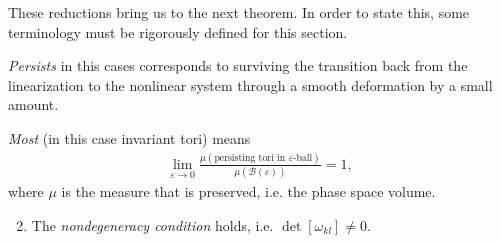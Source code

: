 These reductions bring us to the next theorem. In order to state this, some terminology must be rigorously defined for this section.
\begin{definition}
	\emph{Persists} in this cases corresponds to surviving the transition back from the linearization to the nonlinear system through a smooth deformation by a small amount.
\end{definition}
\begin{definition}
	\emph{Most} (in this case invariant tori) means 
	\begin{align}
		\lim_{\varepsilon \to 0} \frac{\mu ( \textrm{persisting tori in } \varepsilon  \textrm{-ball} )}{\mu (\mathcal{B}(\varepsilon))} = 1,
	\end{align}
	where $\mu $ is the measure that is preserved, i.e. the phase space volume.
\end{definition}
\begin{enumerate}
	\setcounter{enumi}{1}
	\item The \emph{nondegeneracy condition} holds, i.e. $\det[\omega_{kl}]\neq 0$.
\end{enumerate}

